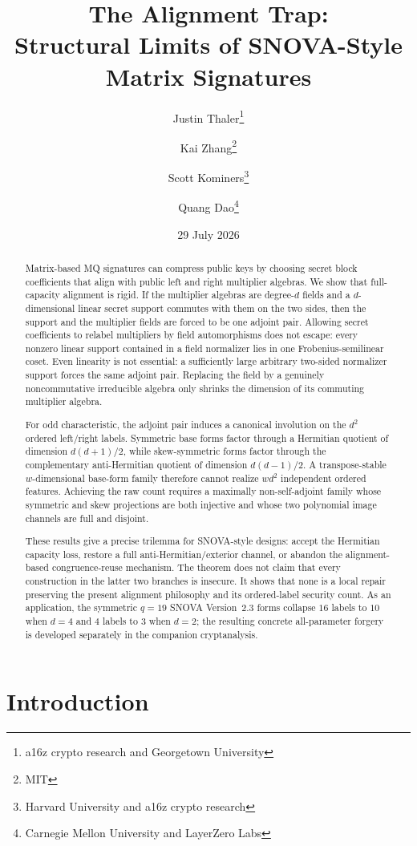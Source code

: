 \documentclass[11pt]{article}
\title{The Alignment Trap:\\Structural Limits of SNOVA-Style Matrix Signatures}
\author{%
  Justin Thaler\thanks{a16z crypto research and Georgetown University} \and
  Kai Zhang\thanks{MIT} \and
  Scott Kominers\thanks{Harvard University and a16z crypto research} \and
  Quang Dao\thanks{Carnegie Mellon University and LayerZero Labs}%
}
\date{29 July 2026}
\begin{document}
\maketitle

\begin{abstract}
Matrix-based MQ signatures can compress public keys by choosing secret block
coefficients that align with public left and right multiplier algebras.  We
show that full-capacity alignment is rigid.  If the multiplier algebras are
degree-$d$ fields and a $d$-dimensional linear secret support commutes with
them on the two sides, then the support and the multiplier fields are forced
to be one adjoint pair.  Allowing secret coefficients to relabel multipliers
by field automorphisms does not escape: every nonzero linear support contained
in a field normalizer lies in one Frobenius-semilinear coset.  Even linearity
is not essential: a sufficiently large arbitrary two-sided normalizer support
forces the same adjoint pair.  Replacing the field by a genuinely
noncommutative irreducible algebra only shrinks the dimension of its commuting
multiplier algebra.

For odd characteristic, the adjoint pair induces a canonical involution on
the $d^2$ ordered left/right labels.  Symmetric base forms factor through a
Hermitian quotient of dimension $d(d+1)/2$, while skew-symmetric forms factor
through the complementary anti-Hermitian quotient of dimension $d(d-1)/2$.
A transpose-stable $w$-dimensional base-form family therefore cannot realize
$wd^2$ independent ordered features.  Achieving the raw count requires a
maximally non-self-adjoint family whose symmetric and skew projections are
both injective and whose two polynomial image channels are full and disjoint.

These results give a precise trilemma for SNOVA-style designs: accept the
Hermitian capacity loss, restore a full anti-Hermitian/exterior channel, or
abandon the alignment-based congruence-reuse mechanism.  The theorem does not
claim that every construction in the latter two branches is insecure.  It
shows that none is a local repair preserving the present alignment philosophy
and its ordered-label security count.  As an application, the symmetric
$q=19$ SNOVA Version~2.3 forms collapse $16$ labels to $10$ when $d=4$ and
$4$ labels to $3$ when $d=2$; the resulting concrete all-parameter forgery is
developed separately in the companion cryptanalysis.
\end{abstract}

\section{Introduction}\label{sec:intro}
\end{document}

